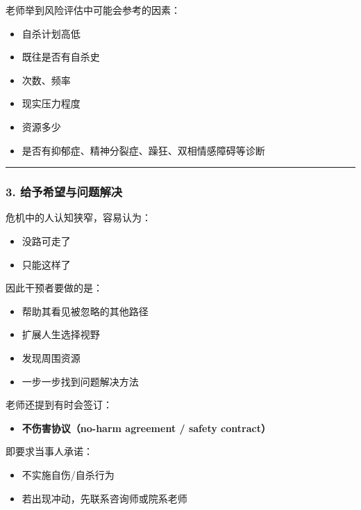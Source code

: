 \documentclass[
  chinese,
  9pt,
  a4paper,
]{ctexart}
\providecommand{\tightlist}{%
  \setlength{\itemsep}{0pt}\setlength{\parskip}{0pt}}
\begin{document}
老师举到风险评估中可能会参考的因素：

\begin{itemize}
\tightlist
\item
  自杀计划高低
\item
  既往是否有自杀史
\item
  次数、频率
\item
  现实压力程度
\item
  资源多少
\item
  是否有抑郁症、精神分裂症、躁狂、双相情感障碍等诊断
\end{itemize}

\begin{center}\rule{0.5\linewidth}{0.5pt}\end{center}

\subsubsection{3.
给予希望与问题解决}\label{ux7ed9ux4e88ux5e0cux671bux4e0eux95eeux9898ux89e3ux51b3}

危机中的人认知狭窄，容易认为：

\begin{itemize}
\tightlist
\item
  没路可走了
\item
  只能这样了
\end{itemize}

因此干预者要做的是：

\begin{itemize}
\tightlist
\item
  帮助其看见被忽略的其他路径
\item
  扩展人生选择视野
\item
  发现周围资源
\item
  一步一步找到问题解决方法
\end{itemize}

老师还提到有时会签订：

\begin{itemize}
\tightlist
\item
  \textbf{不伤害协议（no-harm agreement / safety contract）}
\end{itemize}

即要求当事人承诺：

\begin{itemize}
\tightlist
\item
  不实施自伤/自杀行为
\item
  若出现冲动，先联系咨询师或院系老师
\end{itemize}
\end{document}
